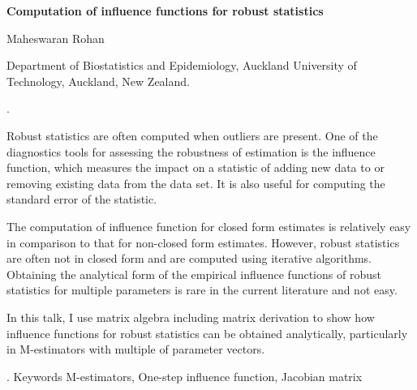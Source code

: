 \documentclass[12pt]{article}
\begin{document}
\begin{flushleft}


{\LARGE\bf Computation of influence functions for robust statistics}


\vspace{1.0cm}

Maheswaran Rohan 

\begin{description}

\item  Department of Biostatistics and Epidemiology,
Auckland University of Technology, Auckland, New Zealand.

\end{description}

\end{flushleft}


\vspace{0.75cm}

. 

Robust statistics are often computed when outliers are present. One of the diagnostics tools for assessing the robustness of estimation is the influence function, which measures the impact on a statistic of adding new data to or removing existing data from the data set. It is also useful for computing the standard error of the statistic.

The computation of influence function for closed form estimates is relatively easy in comparison to that for non-closed form estimates.  However, robust statistics are often not in closed form and are computed using iterative algorithms. Obtaining the analytical form of the empirical influence functions of robust statistics for multiple parameters is rare in the current literature and not easy.  

In this talk, I use matrix algebra including matrix derivation to show how influence functions for robust statistics can be obtained analytically, particularly in M-estimators with multiple of parameter vectors.


\vskip 2mm

.
Keywords M-estimators, One-step influence function, Jacobian matrix 
\end{document}
